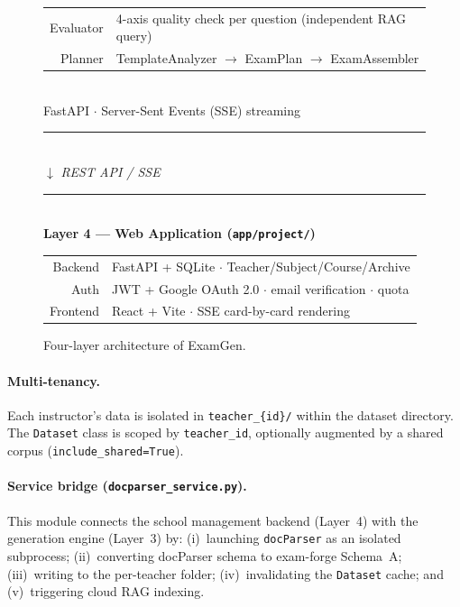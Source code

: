 \documentclass[12pt, a4paper]{article}
\begin{document}
\begin{figure}[H]
{\begin{minipage}{0.93\textwidth}
\begin{tabular}{@{}r@{\;:\;}l@{}}
  Evaluator & 4-axis quality check per question (independent RAG query) \\
  Planner   & TemplateAnalyzer $\to$ ExamPlan $\to$ ExamAssembler \\
\end{tabular}\\[0.3em]
FastAPI $\cdot$ Server-Sent Events (SSE) streaming
\vspace{0.4em}\\\rule{0.87\textwidth}{0.4pt}\\
$\downarrow$ \small\textit{REST API / SSE}
\vspace{0.4em}\\\rule{0.87\textwidth}{0.4pt}\\
\textbf{Layer 4 --- Web Application (\texttt{app/project/})}\\[0.3em]
\begin{tabular}{@{}r@{\;:\;}l@{}}
  Backend  & FastAPI + SQLite $\cdot$ Teacher/Subject/Course/Archive \\
  Auth     & JWT + Google OAuth 2.0 $\cdot$ email verification $\cdot$ quota \\
  Frontend & React + Vite $\cdot$ SSE card-by-card rendering \\
\end{tabular}
\vspace{0.5em}
\end{minipage}
}
\caption{Four-layer architecture of ExamGen.}
\label{fig:arch}
\end{figure}

\paragraph{Multi-tenancy.}
Each instructor's data is isolated in \texttt{teacher\_\{id\}/} within the dataset
directory. The \texttt{Dataset} class is scoped by \texttt{teacher\_id}, optionally
augmented by a shared corpus (\texttt{include\_shared=True}).

\paragraph{Service bridge (\texttt{docparser\_service.py}).}
This module connects the school management backend (Layer~4) with the generation
engine (Layer~3) by: (i)~launching \texttt{docParser} as an isolated subprocess;
(ii)~converting docParser schema to exam-forge Schema~A; (iii)~writing to the
per-teacher folder; (iv)~invalidating the \texttt{Dataset} cache; and
(v)~triggering cloud RAG indexing.
\end{document}

